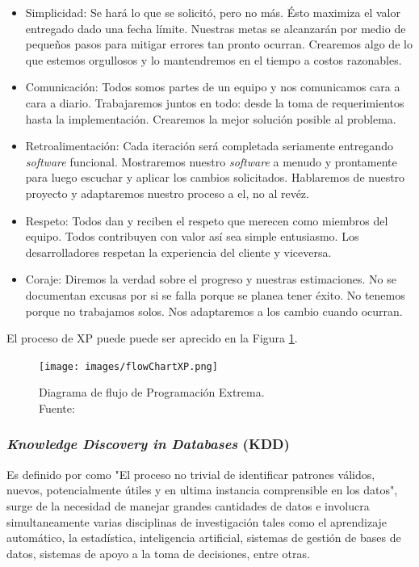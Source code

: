 \begin{itemize}
\item Simplicidad: Se hará lo que se solicitó, pero no más. Ésto maximiza el valor entregado dado una fecha límite. Nuestras metas se alcanzarán por medio de pequeños pasos para mitigar errores tan pronto ocurran. Crearemos algo de lo que estemos orgullosos y lo mantendremos en el tiempo a costos razonables.
\item Comunicación: Todos somos partes de un equipo y nos comunicamos cara a cara a diario. Trabajaremos juntos en todo: desde la toma de requerimientos hasta la implementación. Crearemos la mejor solución posible al problema.
\item Retroalimentación: Cada iteración será completada seriamente entregando \textit{software} funcional. Mostraremos nuestro \textit{software} a menudo y prontamente para luego escuchar y aplicar los cambios solicitados. Hablaremos de nuestro proyecto y adaptaremos nuestro proceso a el, no al revéz.
\item Respeto: Todos dan y reciben el respeto que merecen como miembros del equipo. Todos contribuyen con valor así sea simple entusiasmo. Los desarrolladores respetan la experiencia del cliente y viceversa. 
\item Coraje: Diremos la verdad sobre el progreso y nuestras estimaciones. No se documentan excusas por si se falla porque se planea tener éxito. No tenemos porque no trabajamos solos. Nos adaptaremos a los cambio cuando ocurran.
\end{itemize}

El proceso de XP puede puede ser aprecido en la Figura \ref{fig:procesoXP}.

\begin{figure}[H]
	\centering
	\captionsetup{justification=centering}
	\texttt{[image: images/flowChartXP.png]}
	\caption[Diagrama de flujo de Programación Extrema.]{Diagrama de flujo de Programación Extrema.\\Fuente: \cite{XP}}
	\label{fig:procesoXP}
\end{figure}

\subsubsection*{\textit{Knowledge Discovery in Databases} (KDD)}
\label{subsubsec:kdd}

Es definido por \cite{KDDFayyad} como "El proceso no trivial de identificar patrones válidos, nuevos, potencialmente útiles y en ultima instancia comprensible en los datos", surge de la necesidad de manejar grandes cantidades de datos e involucra simultaneamente varias disciplinas de investigación tales como el aprendizaje automático, la estadística, inteligencia artificial, sistemas de gestión de bases de datos, sistemas de apoyo a la toma de decisiones, entre otras.

